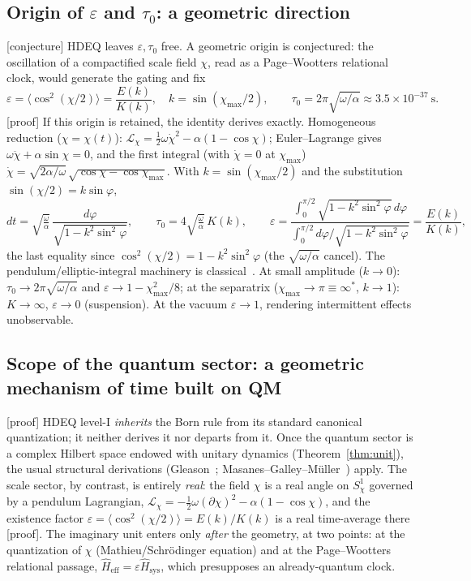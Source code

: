 \documentclass[11pt,a4paper]{article}
\newcommand{\Hsysop}{\hat{H}_{\mathrm{sys}}}
\newcommand{\Heff}{\hat{H}_{\mathrm{eff}}}
\newcommand{\statut}[1]{{\footnotesize\textsf{[#1]}}}
\theoremstyle{plain}
\theoremstyle{definition}
\theoremstyle{remark}
\begin{document}
\subsection{Origin of $\varepsilon$ and $\tau_0$: a geometric direction}\label{sec:origine}
\statut{conjecture} HDEQ leaves $\varepsilon,\tau_0$ free. A geometric origin is
conjectured: the oscillation of a compactified scale field $\chi$, read as a
Page--Wootters relational clock, would generate the gating and fix
\[
\varepsilon=\langle\cos^2(\chi/2)\rangle=\frac{E(k)}{K(k)},\quad
k=\sin(\chi_{\max}/2),\qquad
\tau_0=2\pi\sqrt{\omega/\alpha}\approx3.5\times10^{-37}\ \mathrm{s}.
\]
\statut{proof} If this origin is retained, the identity derives exactly. Homogeneous reduction ($\chi=\chi(t)$): $\mathcal L_\chi=\tfrac12\omega\dot\chi^2-\alpha(1-\cos\chi)$; Euler--Lagrange gives $\omega\ddot\chi+\alpha\sin\chi=0$, and the first integral (with $\dot\chi=0$ at $\chi_{\max}$) $\dot\chi=\sqrt{2\alpha/\omega}\,\sqrt{\cos\chi-\cos\chi_{\max}}$. With $k=\sin(\chi_{\max}/2)$ and the substitution $\sin(\chi/2)=k\sin\varphi$,
\[
dt=\sqrt{\tfrac{\omega}{\alpha}}\,\frac{d\varphi}{\sqrt{1-k^2\sin^2\varphi}},\qquad
\tau_0=4\sqrt{\tfrac{\omega}{\alpha}}\,K(k),\qquad
\varepsilon=\frac{\int_0^{\pi/2}\!\sqrt{1-k^2\sin^2\varphi}\,d\varphi}{\int_0^{\pi/2}\!d\varphi/\sqrt{1-k^2\sin^2\varphi}}=\frac{E(k)}{K(k)},
\]
the last equality since $\cos^2(\chi/2)=1-k^2\sin^2\varphi$ (the $\sqrt{\omega/\alpha}$ cancel). The pendulum/elliptic-integral machinery is classical~\cite{Landau}. At small amplitude ($k\to0$): $\tau_0\to2\pi\sqrt{\omega/\alpha}$ and $\varepsilon\to1-\chi_{\max}^2/8$; at the separatrix ($\chi_{\max}\to\pi\equiv\infty^*$, $k\to1$): $K\to\infty$, $\varepsilon\to0$ (suspension).
At the vacuum $\varepsilon\to1$, rendering intermittent effects unobservable.

\subsection{Scope of the quantum sector: a geometric mechanism of time built on QM}\label{sec:portee-q}
\statut{proof} HDEQ level-I \emph{inherits} the Born rule from its standard canonical quantization; it neither derives it nor departs from it. Once the quantum sector is a complex Hilbert space endowed with unitary dynamics (Theorem~\ref{thm:unit}), the usual structural derivations (Gleason~\cite{Gleason}; Masanes--Galley--M\"uller~\cite{MGM}) apply. The scale sector, by contrast, is entirely \emph{real}: the field $\chi$ is a real angle on $S^1_\chi$ governed by a pendulum Lagrangian, $\mathcal{L}_\chi=-\tfrac12\omega(\partial\chi)^2-\alpha(1-\cos\chi)$, and the existence factor $\varepsilon=\langle\cos^2(\chi/2)\rangle=E(k)/K(k)$ is a real time-average there \statut{proof}. The imaginary unit enters only \emph{after} the geometry, at two points: at the quantization of $\chi$ (Mathieu/Schr\"odinger equation) and at the Page--Wootters relational passage, $\Heff=\varepsilon\Hsysop$, which presupposes an already-quantum clock.
\end{document}
